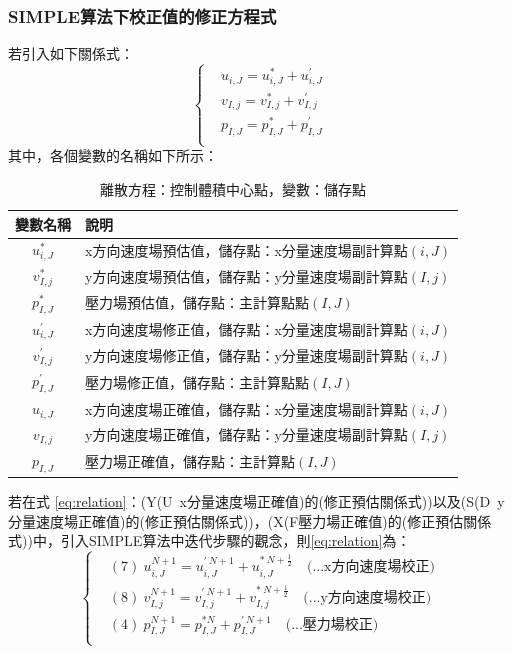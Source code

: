 \documentclass[12pt]{article}
\theoremstyle{upright}
\begin{document}
\subsubsection {SIMPLE算法下校正值的修正方程式}
\label{subsection:simple-mod}
\noindent 若引入如下關係式：
\begin{equation}\label{eq:relation}\left\{\begin{aligned}
    &u_{i,J} = u_{i,J}^{*} + u_{i,J}^{\prime}\\[0.5ex] 
    &v_{I,j} = v_{I,j}^{*} + v_{I,j}^{\prime}\\[0.5ex] 
    &p_{I,J} = p_{I,J}^{*} + p_{I,J}^{\prime}\\[0.5ex] 
\end{aligned}\right.\end{equation}
其中，各個變數的名稱如下所示：
\begin{table}[H]
\centering
\begin{tabularx}{\textwidth}{|c|>{\centering\arraybackslash}X|}
\hline
\textbf{變數名稱} & \textbf{說明} \\
\hline
$u_{i,J}^{*}$ & x方向速度場預估值，儲存點：x分量速度場副計算點$(i,J)$ \\
\hline
$v_{I,j}^{*}$ & y方向速度場預估值，儲存點：y分量速度場副計算點$(I,j)$ \\
\hline
$p_{I,J}^{*}$ & 壓力場預估值，儲存點：主計算點點$(I,J)$ \\
\hline
$u_{i,J}^{\prime}$ & x方向速度場修正值，儲存點：x分量速度場副計算點$(i,J)$ \\
\hline
$v_{I,j}^{\prime}$ & y方向速度場修正值，儲存點：y分量速度場副計算點$(i,J)$ \\
\hline
$p_{I,J}^{\prime}$ & 壓力場修正值，儲存點：主計算點點$(I,J)$ \\
\hline
$u_{i,J}$ & x方向速度場正確值，儲存點：x分量速度場副計算點$(i,J)$ \\
\hline
$v_{I,j}$ & y方向速度場正確值，儲存點：y分量速度場副計算點$(I,j)$ \\
\hline
$p_{I,J}$ & 壓力場正確值，儲存點：主計算點$(I,J)$ \\
\hline
\end{tabularx}
\caption{離散方程：控制體積中心點，變數：儲存點}
\label{tab:simple-variables-adaptive}
\end{table}
\noindent 若在式 \eqref{eq:relation}：(Y(U\ x分量速度場正確值)的(修正預估關係式))以及(S(D\ y分量速度場正確值)的(修正預估關係式))，(X(F壓力場正確值)的(修正預估關係式))中，引入SIMPLE算法中迭代步驟的觀念，則\eqref{eq:relation}為：
\begin{equation}\left\{\label{eq:SIMPLE-relation}\begin{aligned}
    &(7)\  u_{i,J}^{N+1} = u_{i,J}^{\prime\ N+1} + u_{i,J}^{*\ N+\frac{1}{2}}\quad \text{(...x方向速度場校正)}\\[0.5ex]
    &(8)\  v_{I,j}^{N+1} = v_{I,j}^{\prime\ N+1} + v_{I,j}^{*\ N+\frac{1}{2}}\quad \text{(...y方向速度場校正)}\\[0.5ex]
    &(4)\  p_{I,J}^{N+1} = p_{I,J}^{ * N} + p_{I,J}^{\prime\ N+1} \quad \text{(...壓力場校正)}\\[0.5ex]
\end{aligned}\right.\end{equation}
\end{document}
